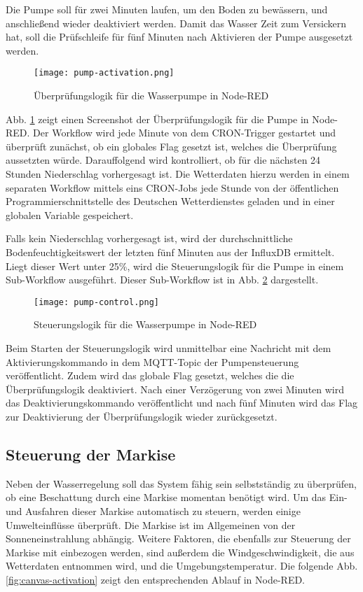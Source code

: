 Die Pumpe soll für zwei Minuten laufen, um den Boden zu bewässern, und anschließend wieder deaktiviert werden. Damit das Wasser Zeit zum Versickern hat, soll die Prüfschleife für fünf Minuten nach Aktivieren der Pumpe ausgesetzt werden.

\begin{figure}[h]
  \centering
  \texttt{[image: pump-activation.png]}
  \caption{Überprüfungslogik für die Wasserpumpe in Node-RED}\label{fig:pump-activation}
\end{figure}

Abb. \ref{fig:pump-activation} zeigt einen Screenshot der Überprüfungslogik für die Pumpe in Node-RED.
Der Workflow wird jede Minute von dem CRON-Trigger gestartet und überprüft zunächst, ob ein globales Flag gesetzt ist, welches die Überprüfung aussetzten würde.
Darauffolgend wird kontrolliert, ob für die nächsten 24 Stunden Niederschlag vorhergesagt ist.
Die Wetterdaten hierzu werden in einem separaten Workflow mittels eins CRON-Jobs jede Stunde von der öffentlichen Programmierschnittstelle des Deutschen Wetterdienstes geladen und in einer globalen Variable gespeichert.

Falls kein Niederschlag vorhergesagt ist, wird der durchschnittliche Bodenfeuchtigkeitswert der letzten fünf Minuten aus der InfluxDB ermittelt.
Liegt dieser Wert unter 25\%, wird die Steuerungslogik für die Pumpe in einem Sub-Workflow ausgeführt.
Dieser Sub-Workflow ist in Abb. \ref{fig:pump-control} dargestellt.

\begin{figure}[h]
  \centering
  \texttt{[image: pump-control.png]}
  \caption{Steuerungslogik für die Wasserpumpe in Node-RED}\label{fig:pump-control}
\end{figure}

Beim Starten der Steuerungslogik wird unmittelbar eine Nachricht mit dem Aktivierungskommando in dem MQTT-Topic der Pumpensteuerung veröffentlicht.
Zudem wird das globale Flag gesetzt, welches die die Überprüfungslogik deaktiviert.
Nach einer Verzögerung von zwei Minuten wird das Deaktivierungskommando veröffentlicht und nach fünf Minuten wird das Flag zur Deaktivierung der Überprüfungslogik wieder zurückgesetzt.

\subsection{Steuerung der Markise}

Neben der Wasserregelung soll das System fähig sein selbstständig zu überprüfen, ob eine Beschattung durch eine Markise momentan benötigt wird. Um  das Ein- und Ausfahren dieser Markise automatisch zu steuern, werden einige Umwelteinflüsse überprüft. Die Markise ist im Allgemeinen von der Sonneneinstrahlung abhängig. Weitere Faktoren, die ebenfalls zur Steuerung der Markise mit einbezogen werden, sind außerdem die Windgeschwindigkeit, die aus Wetterdaten entnommen wird, und die Umgebungstemperatur. 
Die folgende Abb. \ref{fig:canvas-activation} zeigt den entsprechenden Ablauf in Node-RED.


